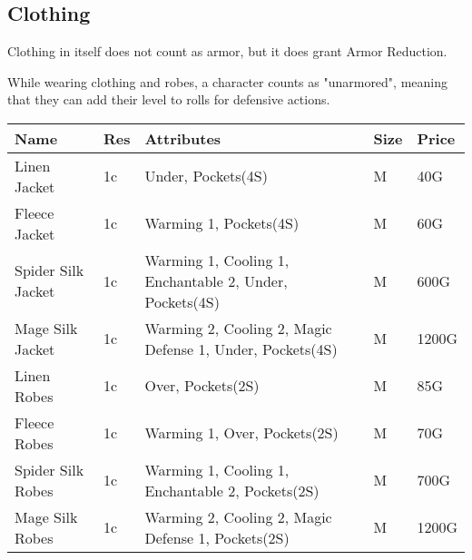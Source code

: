 \subsection{Clothing}\label{subsec:clothing}

Clothing in itself does not count as armor, but it does grant Armor Reduction.

While wearing clothing and robes, a character counts as "unarmored", meaning that they can add their level to rolls for defensive actions.

\begin{longtable}{p{3cm} | p{1.5cm} | p{5cm} | p{1cm} | p{1.5cm}}
	Name & Res &   Attributes & Size & Price\\ \hline

	Linen Jacket & 1c & Under, Pockets(4S) & M & 40G\\
	
	Fleece Jacket & 1c & Warming 1, Pockets(4S) & M & 60G\\
	
	Spider Silk Jacket & 1c & Warming 1, Cooling 1, Enchantable 2, Under, Pockets(4S) & M & 600G\\
	
	Mage Silk Jacket & 1c & Warming 2, Cooling 2, Magic Defense 1, Under, Pockets(4S) & M & 1200G\\
	
	Linen Robes & 1c & Over, Pockets(2S) & M & 85G\\
	
	Fleece Robes & 1c & Warming 1, Over, Pockets(2S)  & M & 70G\\

	Spider Silk Robes & 1c & Warming 1, Cooling 1, Enchantable 2, Pockets(2S)  & M & 700G\\
	
	Mage Silk Robes & 1c & Warming 2, Cooling 2, Magic Defense 1, Pockets(2S)  & M & 1200G\\
\end{longtable}
